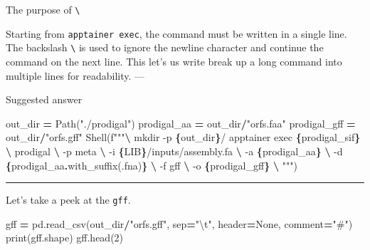 \documentclass[
]{book}
\newenvironment{Shaded}{\begin{snugshade}}{\end{snugshade}}
\newcommand{\BuiltInTok}[1]{#1}
\newcommand{\CharTok}[1]{\textcolor[rgb]{0.31,0.60,0.02}{#1}}
\newcommand{\DecValTok}[1]{\textcolor[rgb]{0.00,0.00,0.81}{#1}}
\newcommand{\NormalTok}[1]{#1}
\newcommand{\OperatorTok}[1]{\textcolor[rgb]{0.81,0.36,0.00}{\textbf{#1}}}
\newcommand{\SpecialCharTok}[1]{\textcolor[rgb]{0.81,0.36,0.00}{\textbf{#1}}}
\newcommand{\SpecialStringTok}[1]{\textcolor[rgb]{0.31,0.60,0.02}{#1}}
\newcommand{\StringTok}[1]{\textcolor[rgb]{0.31,0.60,0.02}{#1}}
\newcommand{\VariableTok}[1]{\textcolor[rgb]{0.00,0.00,0.00}{#1}}
\begin{document}
The purpose of \texttt{\textbackslash{}}

Starting from \texttt{apptainer\ exec}, the command must be written in a single line.
The backslash \texttt{\textbackslash{}} is used to ignore the newline character and continue the command on the next line.
This let's us write break up a long command into multiple lines for readability.
---

Suggested answer

\begin{Shaded}
\begin{Highlighting}[numbers=left,,]
\NormalTok{out\_dir }\OperatorTok{=}\NormalTok{ Path(}\StringTok{"./prodigal"}\NormalTok{)}
\NormalTok{prodigal\_aa }\OperatorTok{=}\NormalTok{ out\_dir}\OperatorTok{/}\StringTok{"orfs.faa"}
\NormalTok{prodigal\_gff }\OperatorTok{=}\NormalTok{ out\_dir}\OperatorTok{/}\StringTok{"orfs.gff"}
\NormalTok{Shell(}\SpecialStringTok{f"""}\OperatorTok{\textbackslash{}}
\SpecialStringTok{mkdir {-}p }\SpecialCharTok{\{}\NormalTok{out\_dir}\SpecialCharTok{\}}\SpecialStringTok{/}
\SpecialStringTok{apptainer exec }\SpecialCharTok{\{}\NormalTok{prodigal\_sif}\SpecialCharTok{\}}\SpecialStringTok{ }\OperatorTok{\textbackslash{}}
\SpecialStringTok{    prodigal }\OperatorTok{\textbackslash{}}
\SpecialStringTok{        {-}p meta }\OperatorTok{\textbackslash{}}
\SpecialStringTok{        {-}i }\SpecialCharTok{\{}\NormalTok{LIB}\SpecialCharTok{\}}\SpecialStringTok{/inputs/assembly.fa }\OperatorTok{\textbackslash{}}
\SpecialStringTok{        {-}a }\SpecialCharTok{\{}\NormalTok{prodigal\_aa}\SpecialCharTok{\}}\SpecialStringTok{ }\OperatorTok{\textbackslash{}}
\SpecialStringTok{        {-}d }\SpecialCharTok{\{}\NormalTok{prodigal\_aa}\SpecialCharTok{.}\NormalTok{with\_suffix(}\StringTok{\textquotesingle{}.fna\textquotesingle{}}\NormalTok{)}\SpecialCharTok{\}}\SpecialStringTok{ }\OperatorTok{\textbackslash{}}
\SpecialStringTok{        {-}f gff }\OperatorTok{\textbackslash{}}
\SpecialStringTok{        {-}o }\SpecialCharTok{\{}\NormalTok{prodigal\_gff}\SpecialCharTok{\}}\SpecialStringTok{ }\OperatorTok{\textbackslash{}}
\SpecialStringTok{"""}\NormalTok{)}
\end{Highlighting}
\end{Shaded}

\begin{center}\rule{0.5\linewidth}{0.5pt}\end{center}

Let's take a peek at the \texttt{gff}.

\begin{Shaded}
\begin{Highlighting}[numbers=left,,]
\NormalTok{gff }\OperatorTok{=}\NormalTok{ pd.read\_csv(out\_dir}\OperatorTok{/}\StringTok{"orfs.gff"}\NormalTok{, sep}\OperatorTok{=}\StringTok{"}\CharTok{\textbackslash{}t}\StringTok{"}\NormalTok{, header}\OperatorTok{=}\VariableTok{None}\NormalTok{, comment}\OperatorTok{=}\StringTok{"\#"}\NormalTok{)}
\BuiltInTok{print}\NormalTok{(gff.shape)}
\NormalTok{gff.head(}\DecValTok{2}\NormalTok{)}
\end{Highlighting}
\end{Shaded}
\end{document}
